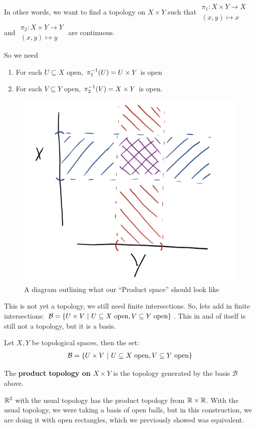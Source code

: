 \documentclass[12pt, twosided]{article}
\begin{document}
    In other words, we want to find a topology on \(X \times Y\) such that \(
    \begin{matrix}
      \pi_1: X \times Y \to X \\ (x, y) \mapsto x
    \end{matrix}
    \) and \(
    \begin{matrix}
      \pi_2: X \times Y \to Y \\ (x, y) \mapsto y
    \end{matrix}
    \) are continuous.

    So we need
    \begin{enumerate}
    \item For each \(U \subseteq X\) open, \(\pi_1^{-1}(U) = U \times Y\) is open
    \item For each \(V \subseteq Y\) open, \(\pi_2^{-1}(V) = X \times Y\) is open.
    \end{enumerate}

    \begin{figure}[h]
      \centering
      \includegraphics[width=.5\textwidth]{ProductTop}
      \caption{A diagram outlining what our ``Product space'' should look like}
      \label{fig:prodTop}
    \end{figure}
    This is not yet a topology, we still need finite intersections. So, lets add in finite intersections: \(\mathcal{B} = \opn U \times V \stbar U \subseteq X\ \mathrm{open}, V \subseteq Y\ \mathrm{open} \cls\). This in and of itself is still not a topology, but it is a basis.

    \begin{prop}
      Let \(X, Y\) be topological spaces, then the set:
      \begin{align*}
        \mathcal{B} = \opn U \times V \stbar U \subseteq X\ \mathrm{open}, V \subseteq Y\ \mathrm{open} \cls
      \end{align*}
    \end{prop}

    \begin{df}
      The \textbf{product topology on \(X \times Y\)} is the topology generated by the basis \(\mathcal{B}\) above.
    \end{df}

    \begin{exa}
      \(\mathbb{R}^2\) with the usual topology has the product topology from \(\mathbb{R} \times \mathbb{R}\). With the usual topology, we were taking a basis of open balls, but in this construction, we are doing it with open rectangles, which we previously showed was equivalent.
    \end{exa}
\end{document}
